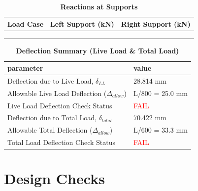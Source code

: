\documentclass[12pt,a4paper]{report}
\numberwithin{table}{chapter}
\numberwithin{figure}{chapter}
\begin{document}
\vspace{1em}
\begin{longtable}{|>{\centering\arraybackslash}p{5.2cm}|>{\centering\arraybackslash}p{5.2cm}|>{\centering\arraybackslash}p{5.2cm}|}
\caption{\textbf{Reactions at Supports}}
\hline
\textbf{Load Case} & \textbf{Left Support (kN)} & \textbf{Right Support (kN)} \\[6pt]
\hline
 &  &  \\[6pt]
\hline
 &  &  \\[6pt]
\hline
 &  &  \\[6pt]
\hline
\end{longtable}

\vspace{1em}
\begin{longtable}{|L{7cm}|p{8.5cm}|}
\caption{\textbf{Deflection Summary (Live Load \& Total Load)}}
\hline
\textbf{parameter} & \textbf{value} \\
\hline
\textnormal{Deflection due to Live Load, $\delta_{LL}$} & 28.814 mm \\[6pt]
\hline
\textnormal{Allowable Live Load Deflection ($\Delta_{allow}$)} & L/800 = 25.0 mm \\[6pt]
\hline
\textnormal{Live Load Deflection Check Status} & \textcolor{red}{FAIL} \\[6pt]
\hline
\textnormal{Deflection due to Total Load, $\delta_{total}$} & 70.422 mm \\[6pt]
\hline
\textnormal{Allowable Total Deflection ($\Delta_{allow}$)} & L/600 = 33.3 mm \\[6pt]
\hline
\textnormal{Total Load Deflection Check Status} & \textcolor{red}{FAIL} \\[6pt]
\hline
\end{longtable}

\vspace{1em}
\noindent
\noindent{}
\noindent{}
\noindent{}


\chapter{Design Checks}
\end{document}

